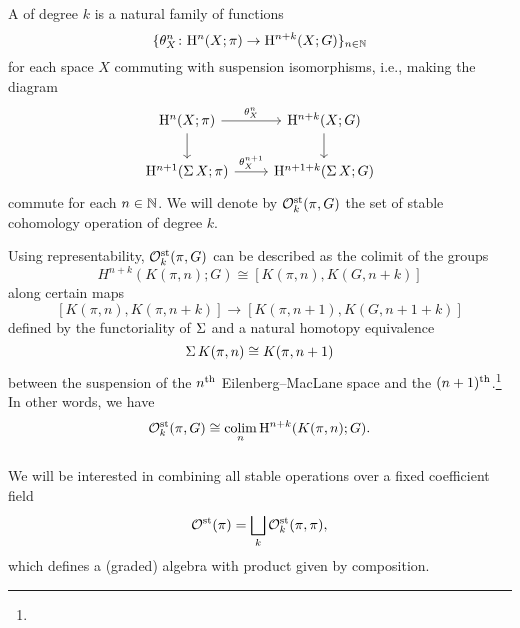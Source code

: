 \subsubsection{} A  of degree $k$ is a natural family of functions
\[
\{\theta^n_X \colon \mathrm{H}^n(X; \pi) \to \mathrm{H}^{n+k}(X; G)\}_{n \in \mathbb{N}}
\]
for each space $X$ commuting with suspension isomorphisms, i.e., making the diagram
\[
\begin{tikzcd}
	\rH^n(X; \pi) \rar["\theta^n_X"] \dar & \rH^{n+k}(X; G) \dar \\
	\rH^{n+1}(\sus X; \pi) \rar["\theta^{n+1}_X"] & \rH^{n+1+k}(\sus X; G)
\end{tikzcd}
\]
commute for each $n \in \mathbb{N}$.
We will denote by $\mathcal{O}^{\mathrm{st}}_k(\pi, G)$ the set of stable cohomology operation of degree $k$.


Using representability, $\mathcal{O}^{\mathrm{st}}_k(\pi, G)$ can be described as the colimit of the groups
\[
H^{n+k}(K(\pi, n); G) \cong [K(\pi, n), K(G, n+k)]
\]
along certain maps
\[
[K(\pi, n), K(\pi, n+k)] \to [K(\pi, n+1), K(G, n+1+k)]
\]
defined by the functoriality of $\operatorname{\Sigma}$ and a natural homotopy equivalence
\begin{equation}\label{eq:suspension of K(pi,n)}
	\operatorname{\Sigma} K(\pi, n) \cong K(\pi, n+1)
\end{equation}
between the suspension of the $n^{\mathrm{th}}$ Eilenberg--MacLane space and the $(n+1)^{\mathrm{th}}$.\footnote{}
In other words, we have
\[
\mathcal{O}^{\mathrm{st}}_k(\pi, G) \cong \operatorname*{colim}_n \mathrm{H}^{n+k}(K(\pi, n); G).
\]

\subsubsection{} We will be interested in combining all stable operations over a fixed coefficient field
\[
\mathcal{O}^{\mathrm{st}}(\pi) = \bigsqcup_k \mathcal{O}^{\mathrm{st}}_k(\pi, \pi),
\]
which defines a (graded) algebra with product given by composition.

